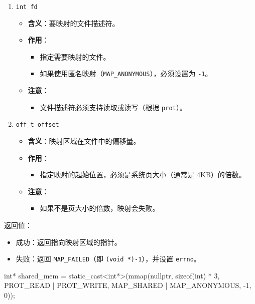 \begin{enumerate}
    \item \texttt{int fd}
    \begin{itemize}
        \item \textbf{含义}：要映射的文件描述符。
        \item \textbf{作用}：
        \begin{itemize}
            \item 指定需要映射的文件。
            \item 如果使用匿名映射（\texttt{MAP\_ANONYMOUS}），必须设置为 \texttt{-1}。
        \end{itemize}
        \item \textbf{注意}：
        \begin{itemize}
            \item 文件描述符必须支持读取或读写（根据 \texttt{prot}）。
        \end{itemize}
    \end{itemize}

    \item \texttt{off\_t offset}
    \begin{itemize}
        \item \textbf{含义}：映射区域在文件中的偏移量。
        \item \textbf{作用}：
        \begin{itemize}
            \item 指定映射的起始位置，必须是系统页大小（通常是 4KB）的倍数。
        \end{itemize}
        \item \textbf{注意}：
        \begin{itemize}
            \item 如果不是页大小的倍数，映射会失败。
        \end{itemize}
    \end{itemize}
\end{enumerate}

返回值：\begin{itemize}
    \item 成功：返回指向映射区域的指针。
    \item 失败：返回 \texttt{MAP\_FAILED}（即 \texttt{(void *)-1}），并设置 \texttt{errno}。
\end{itemize}

\begin{cppcode}
int* shared_mem = static_cast<int*>(mmap(nullptr, sizeof(int) * 3, PROT_READ | PROT_WRITE, MAP_SHARED | MAP_ANONYMOUS, -1, 0));
\end{cppcode}

